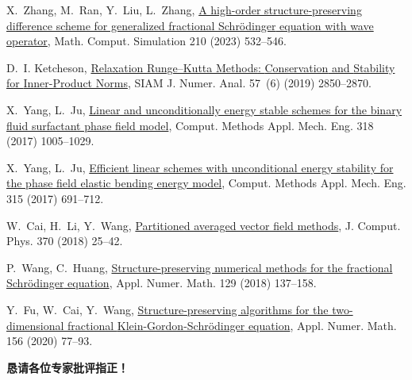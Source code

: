\documentclass[aspectratio=169]{beamer}
\begin{document}
\begin{frame}[allowframebreaks]
\begin{thebibliography}{10}
	X.~Zhang, M.~Ran, Y.~Liu, L.~Zhang,
	  \href{https://www.sciencedirect.com/science/article/pii/S0378475423001325}{A
	  high-order structure-preserving difference scheme for generalized fractional
	  {{Schr\"odinger}} equation with wave operator}, Math. Comput. Simulation 210
	  (2023) 532--546.
 
	D.~I. Ketcheson,
	  \href{https://epubs.siam.org/doi/abs/10.1137/19M1263662}{Relaxation
	  {{Runge--Kutta Methods}}: {{Conservation}} and {{Stability}} for
	  {{Inner-Product Norms}}}, SIAM J. Numer. Anal. 57~(6) (2019) 2850--2870.
 
	 
	X.~Yang, L.~Ju,
	  \href{https://www.sciencedirect.com/science/article/pii/S0045782516317856}{Linear
	  and unconditionally energy stable schemes for the binary fluid\textendash
	  surfactant phase field model}, Comput. Methods Appl. Mech. Eng. 318 (2017)
	  1005--1029.
 
	X.~Yang, L.~Ju,
	  \href{https://www.sciencedirect.com/science/article/pii/S0045782516306016}{Efficient
	  linear schemes with unconditional energy stability for the phase field
	  elastic bending energy model}, Comput. Methods Appl. Mech. Eng. 315 (2017)
	  691--712.
 
	W.~Cai, H.~Li, Y.~Wang,
	  \href{https://linkinghub.elsevier.com/retrieve/pii/S0021999118303012}{Partitioned
	  averaged vector field methods}, J. Comput. Phys. 370 (2018) 25--42.
 
	P.~Wang, C.~Huang,
	  \href{https://linkinghub.elsevier.com/retrieve/pii/S0168927418300709}{Structure-preserving
	  numerical methods for the fractional {{Schr\"odinger}} equation}, Appl.
	  Numer. Math. 129 (2018) 137--158.
 
	Y.~Fu, W.~Cai, Y.~Wang,
	  \href{https://www.sciencedirect.com/science/article/pii/S0168927420301264}{Structure-preserving
	  algorithms for the two-dimensional fractional {{Klein-Gordon-Schr\"odinger}}
	  equation}, Appl. Numer. Math. 156 (2020) 77--93.
 
	\end{thebibliography}
	
\end{frame}

\begin{frame}
\begin{center}
{\Huge\calligra \textbf{\textcolor[rgb]{0.227,0.373,0.306}{恳请各位专家批评指正！}}}
\end{center}
\end{frame}
\end{document}
